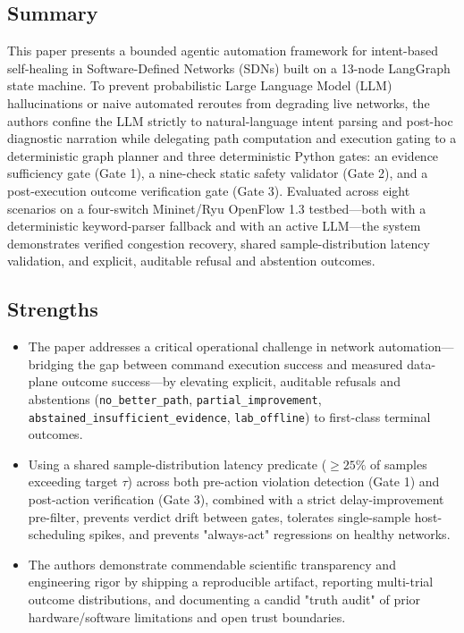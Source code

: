 \documentclass[11pt,a4paper]{article}
\begin{document}
\subsection*{Summary}
This paper presents a bounded agentic automation framework for intent-based self-healing in Software-Defined Networks (SDNs) built on a 13-node LangGraph state machine. To prevent probabilistic Large Language Model (LLM) hallucinations or naive automated reroutes from degrading live networks, the authors confine the LLM strictly to natural-language intent parsing and post-hoc diagnostic narration while delegating path computation and execution gating to a deterministic graph planner and three deterministic Python gates: an evidence sufficiency gate (Gate 1), a nine-check static safety validator (Gate 2), and a post-execution outcome verification gate (Gate 3). Evaluated across eight scenarios on a four-switch Mininet/Ryu OpenFlow 1.3 testbed—both with a deterministic keyword-parser fallback and with an active LLM—the system demonstrates verified congestion recovery, shared sample-distribution latency validation, and explicit, auditable refusal and abstention outcomes.
\subsection*{Strengths}
\begin{itemize}[leftmargin=1.8em,itemsep=2pt]
\item The paper addresses a critical operational challenge in network automation—bridging the gap between command execution success and measured data-plane outcome success—by elevating explicit, auditable refusals and abstentions (\texttt{no\_better\_path}, \texttt{partial\_improvement}, \texttt{abstained\_insufficient\_evidence}, \texttt{lab\_offline}) to first-class terminal outcomes.
\item Using a shared sample-distribution latency predicate ($\ge 25\%$ of samples exceeding target $\tau$) across both pre-action violation detection (Gate 1) and post-action verification (Gate 3), combined with a strict delay-improvement pre-filter, prevents verdict drift between gates, tolerates single-sample host-scheduling spikes, and prevents "always-act" regressions on healthy networks.
\item The authors demonstrate commendable scientific transparency and engineering rigor by shipping a reproducible artifact, reporting multi-trial outcome distributions, and documenting a candid "truth audit" of prior hardware/software limitations and open trust boundaries.
\end{itemize}
\end{document}

